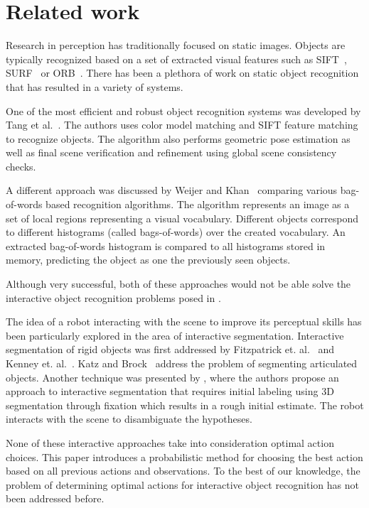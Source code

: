 \section{Related work}



    Research in perception has traditionally focused on static images. Objects are typically recognized based on a set of extracted visual features such as SIFT~\cite{lowe2004distinctive}, SURF~\cite{bay2006surf} or ORB~\cite{rublee2011orb}.
    There has been a plethora of work on static object recognition that has resulted in a variety of systems.

    One of the most efficient and robust object recognition systems was developed by Tang et al.~\cite{tang2012textured}. The authors uses color model matching and SIFT feature matching to recognize objects. The algorithm also performs geometric pose estimation as well as final scene verification and refinement using global scene consistency checks. 

    A different approach was discussed by Weijer and Khan~\cite{van2013fusing} comparing various bag-of-words based recognition algorithms. The algorithm represents an image as a set of local regions representing a visual vocabulary. Different objects correspond to different histograms (called bags-of-words) over the created vocabulary. An extracted bag-of-words histogram is compared to all histograms stored in memory, predicting the object as one the previously seen objects.

    Although very successful, both of these approaches would not be able solve the interactive object recognition problems posed in .

    The idea of a robot interacting with the scene to improve its perceptual skills has been particularly explored in the area of interactive segmentation. Interactive segmentation of rigid objects was first addressed by Fitzpatrick et. al.~\cite{fitzpatrick_active_vision} and Kenney et. al.~\cite{KenneyInteractive}. Katz and Brock~\cite{Katz-WS-MM-ICRA2011} address the problem of segmenting articulated objects. Another technique was presented by \cite{bergstrom11icvs}, where the authors propose an approach to interactive segmentation that requires initial labeling using 3D segmentation through fixation which results in a rough initial estimate. The robot interacts with the scene to disambiguate the hypotheses.

    None of these interactive approaches take into consideration optimal action choices. This paper introduces a probabilistic method for choosing the best action based on all previous actions and observations. To the best of our knowledge, the problem of determining optimal actions for interactive object recognition has not been addressed before.
